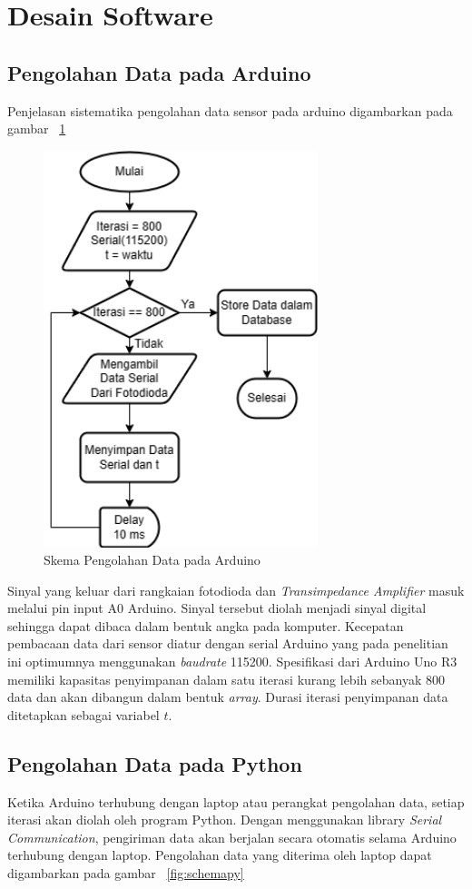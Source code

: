 \section{Desain Software}

\subsection{Pengolahan Data pada Arduino}
Penjelasan sistematika pengolahan data sensor pada arduino digambarkan pada gambar
~\ref{fig:schemaard}

\begin{figure}[H]
    \centering
    \includegraphics[width=8cm]{Images/Skema Arduino.png}
    \caption{Skema Pengolahan Data pada Arduino}
    \label{fig:schemaard}
\end{figure}
Sinyal yang keluar dari rangkaian fotodioda dan \textit{Transimpedance Amplifier} masuk melalui
pin input A0 Arduino. Sinyal tersebut diolah menjadi sinyal digital sehingga dapat dibaca dalam
bentuk angka pada komputer. Kecepatan pembacaan data dari sensor diatur dengan serial Arduino
yang pada penelitian ini optimumnya menggunakan \textit{baudrate} 115200. Spesifikasi dari
Arduino Uno R3 memiliki kapasitas penyimpanan dalam satu iterasi kurang lebih sebanyak 800
data dan akan dibangun dalam bentuk \textit{array}. Durasi iterasi penyimpanan data ditetapkan
sebagai variabel ${t}$.



\subsection{Pengolahan Data pada Python}
Ketika Arduino terhubung dengan laptop atau perangkat pengolahan data, setiap iterasi akan diolah
oleh program Python. Dengan menggunakan library \textit{Serial Communication}, pengiriman data
akan berjalan secara otomatis selama Arduino terhubung dengan laptop. Pengolahan data yang
diterima oleh laptop dapat digambarkan pada gambar ~\ref{fig:schemapy}

